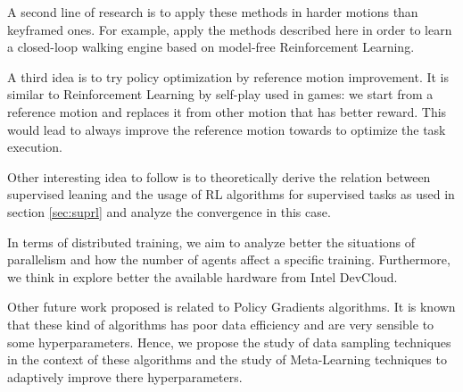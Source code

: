 A second line of research is to apply these methods in harder motions than keyframed ones. For example, apply the methods described here in order to learn a closed-loop walking engine based on model-free Reinforcement Learning.

A third idea is to try policy optimization by reference motion improvement. It is similar to Reinforcement Learning by self-play used in games: we start from a reference motion and replaces it from other motion that has better reward. This would lead to always improve the reference motion towards to optimize the task execution.

Other interesting idea to follow is to theoretically derive the relation between supervised leaning and the usage of RL algorithms for supervised tasks as used in section \ref{sec:suprl} and analyze the convergence in this case.

In terms of distributed training, we aim to analyze better the situations of parallelism and how the number of agents affect a specific training. Furthermore, we think in explore better the available hardware from Intel DevCloud.


Other future work proposed is related to Policy Gradients algorithms. It is known that these kind of algorithms has poor data efficiency and are very sensible to some hyperparameters. Hence, we propose the study of data sampling techniques in the context of these algorithms and the study of Meta-Learning techniques \cite{metalearning} to adaptively improve there hyperparameters.


